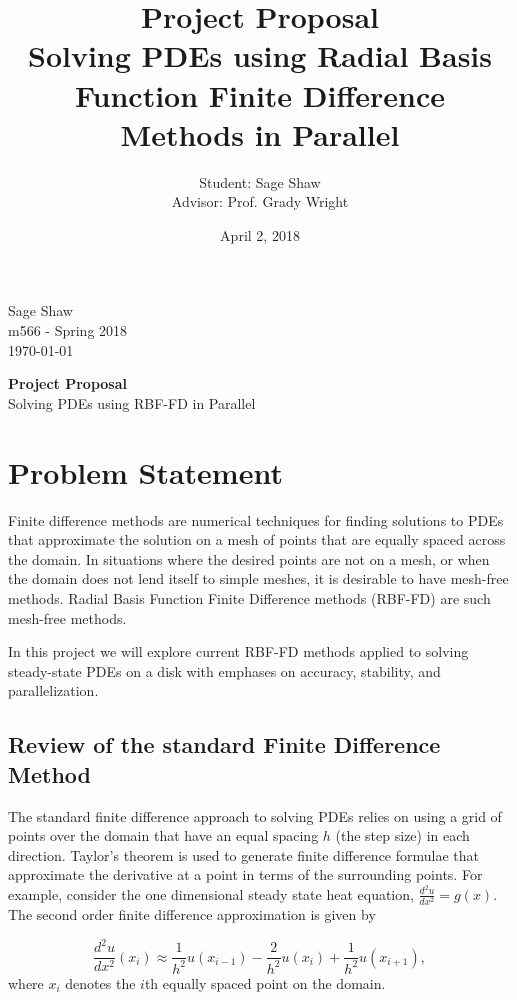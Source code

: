 \documentclass[12pt]{article}
\title{Project Proposal\\ \large Solving PDEs using Radial Basis Function Finite Difference Methods in Parallel}
\author{Student: Sage Shaw\\ Advisor: Prof. Grady Wright}
\date{April 2, 2018}
\begin{document}
	\thispagestyle{empty}
	
	\begin{flushright}
		Sage Shaw \\
		m566 - Spring 2018 \\
		\today
	\end{flushright}
	
	\begin{center}
		\Huge \textbf{Project Proposal} \\
		\large Solving PDEs using RBF-FD in Parallel
	\end{center}

\section{Problem Statement} 
Finite difference methods are numerical techniques for finding solutions to PDEs that approximate the solution on a mesh of points that are equally spaced across the domain. In situations where the desired points are not on a mesh, or when the domain does not lend itself to simple meshes, it is desirable to have mesh-free methods. Radial Basis Function Finite Difference methods (RBF-FD) are such mesh-free methods. 

In this project we will explore current RBF-FD methods applied to solving steady-state PDEs on a disk with emphases on accuracy, stability, and parallelization.

\subsection{Review of the standard Finite Difference Method} 
The standard finite difference approach to solving PDEs relies on using a grid of points over the domain that have an equal spacing $h$ (the step size) in each direction. Taylor's theorem is used to generate finite difference formulae that approximate the derivative at a point in terms of the surrounding points. For example, consider the one dimensional steady state heat equation, $\frac{d^2u}{dx^2} = g(x)$. The second order finite difference approximation is given by

$$
\frac{d^2u}{dx^2}(x_i) \approx \frac{1}{h^2}u(x_{i-1}) - \frac{2}{h^2} u(x_i) + \frac{1}{h^2} u(x_{i+1}),
$$
where $x_i$ denotes the $i$th equally spaced point on the domain.
\end{document}

